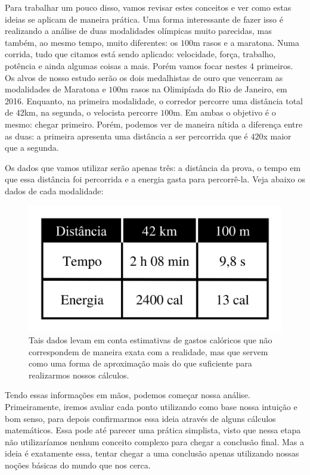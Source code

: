 \begin{multicols}{2}
Para trabalhar um pouco disso, vamos revisar estes conceitos e ver como estas ideias se aplicam de maneira prática. Uma forma interessante de fazer isso é realizando a análise de duas modalidades olímpicas muito parecidas, mas também, ao mesmo tempo, muito diferentes: os $100$m rasos e a maratona. Numa corrida, tudo que citamos está sendo aplicado: velocidade, força, trabalho, potência e ainda algumas coisas a mais. Porém vamos focar nestes 4 primeiros. Os alvos de nosso estudo serão os dois medalhistas de ouro que venceram as modalidades de Maratona e $100$m rasos na Olimipíada do Rio de Janeiro, em 2016. Enquanto, na primeira modalidade, o corredor percorre uma distância total de $42$km, na segunda, o velocista percorre $100$m. Em ambas o objetivo é o mesmo: chegar primeiro. Porém, podemos ver de maneira nítida a diferença entre as duas: a primeira apresenta uma distância a ser percorrida que é $420$x maior que a segunda.

Os dados que vamos utilizar serão apenas três: a distância da prova, o tempo em que essa distância foi percorrida e a energia gasta para percorrê-la. Veja abaixo os dados de cada modalidade:


\begin{figure}[H]
    \centering
    \includegraphics[width=\linewidth]{Figuras/Artigo4/tabela.jpg}
    \caption{Tais dados levam em conta estimativas de gastos calóricos que não correspondem de maneira exata com a realidade, mas que servem como uma forma de aproximação mais do que suficiente para realizarmos nossos cálculos.}
    \label{corredores}
\end{figure}

Tendo essas informações em mãos, podemos começar nossa análise. Primeiramente, iremos avaliar cada ponto utilizando como base nossa intuição e bom senso, para depois confirmarmos essa ideia através de alguns cálculos matemáticos. Essa pode até parecer uma prática simplista, visto que nessa etapa não utilizaríamos nenhum conceito complexo para chegar a conclusão final. Mas a ideia é exatamente essa, tentar chegar a uma conclusão apenas utilizando nossas noções básicas do mundo que nos cerca.


\end{multicols}
